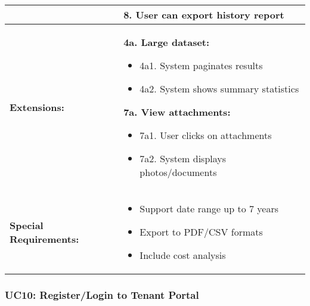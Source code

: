 \documentclass[12pt]{article}
\begin{document}
\begin{longtable}{|p{3cm}|p{11cm}|}
& 8. User can export history report \\
\hline
\textbf{Extensions:} & 
\textbf{4a. Large dataset:}
\begin{itemize}
    \item 4a1. System paginates results
    \item 4a2. System shows summary statistics
\end{itemize}
\textbf{7a. View attachments:}
\begin{itemize}
    \item 7a1. User clicks on attachments
    \item 7a2. System displays photos/documents
\end{itemize} \\
\hline
\textbf{Special Requirements:} & 
\begin{itemize}
    \item Support date range up to 7 years
    \item Export to PDF/CSV formats
    \item Include cost analysis
\end{itemize} \\
\hline
\end{longtable}


\subsubsection{UC10: Register/Login to Tenant Portal}
\end{document}
